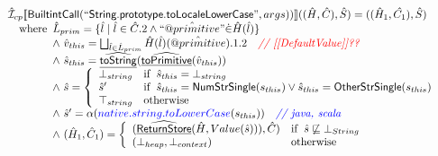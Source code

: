\[\begin{array}{l}
\hat{\mathcal{I}} _{cp}\llbracket \mbox{\textsf{BuiltintCall}}(``\mbox{\textsf{String.prototype.toLocaleLowerCase}}",args))\rrbracket((\hat{H},\hat{C}), \hat{S})
  = ((\hat{H}_1, \hat{C_1}), \hat{S})\\
\quad{\rm where}\begin{array}[t]{l} 
  \hat{L}_{prim} = \{ \hat{l} \mid \hat{l} \in \hat{C}.2 \land ``\hat{@primitive}" \dot{\in}\hat{H}(\hat{l}) \}\\
  \land\ \hat{v}_{this} = \bigsqcup_{\hat{l} \in \hat{L}_{prim}} \hat{H}(\hat{l})(\hat{@primitive}).1.2
    \quad\textit{{\color{red}// [[DefaultValue]]??}}\\
  \land\ \hat{s}_{this} = \widehat{\underline{\sf toString}}(\widehat{\underline{\sf toPrimitive}}(\hat{v}_{this}))\\
  \land\ \hat{s} = \left\{\begin{array}{ll}
      \bot_{string} & {\rm if}\begin{array}[t]{l}\hat{s}_{this} = \bot_{string}\end{array}\\
      \hat{s}' & {\rm if}\begin{array}[t]{l}\hat{s}_{this} = \mbox{\textsf{NumStrSingle}}(s_{this}) \lor \hat{s}_{this} = \mbox{\textsf{OtherStrSingle}}(s_{this}) \end{array}\\
      \top_{string} & {\rm otherwise}
    \end{array}\right.\\
  \land\ \hat{s}' = \alpha({\color{blue} native.string.toLowerCase}(s_{this}))
    \quad\textit{{\color{blue}// java, scala}}\\  
  \land\ (\hat{H}_1, \hat{C}_1) = 
    \left\{\begin{array}{ll}
      (\widehat{\underline{\sf ReturnStore}}(\hat{H}, Value(\hat{s}))), \hat{C})
      & {\rm if}\begin{array}[t]{l}\hat{s} \not\sqsubseteq \bot_{String}\end{array}\\
      (\bot_{heap}, \bot_{context}) & {\rm otherwise} \\
    \end{array}\right.\\
  \end{array}\\
\\\\

\end{array}
\]

